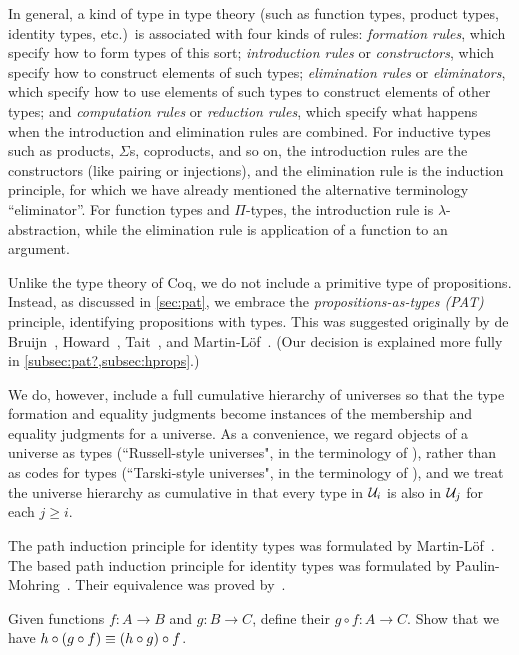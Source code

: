 In general, a kind of type in type theory (such as function types, product types, identity types, etc.)\ is associated with four kinds of rules: \emph{formation rules}, which specify how to form types of this sort; \emph{introduction rules}  or \emph{constructors}, which specify how to construct elements of such types; \emph{elimination rules} or \emph{eliminators}, which specify how to use elements of such types to construct elements of other types; and \emph{computation rules} or \emph{reduction rules}, which specify what happens when the introduction and elimination rules are combined.
For inductive types such as products, $\Sigma$s, coproducts, and so on, the introduction rules are the constructors (like pairing or injections), and the elimination rule is the induction principle, for which we have already mentioned the alternative terminology ``eliminator''.
For function types and $\Pi$-types, the introduction rule is $\lambda$-abstraction, while the elimination rule is application of a function to an argument.

Unlike the type theory of Coq, we do not include a primitive type of propositions.  Instead, as discussed in \autoref{sec:pat}, we embrace the \emph{propositions-as-types (PAT)} principle, identifying propositions with types.
This was suggested originally by de Bruijn~\cite{deBruijn-1973}, Howard~\cite{howard:pat}, Tait~\cite{Tait-1968}, and Martin-L\"{o}f~\cite{Martin-Lof-1972}.
(Our decision is explained more fully in \autoref{subsec:pat?,subsec:hprops}.)

We do, however, include a full cumulative hierarchy of universes so that the type formation and equality judgments become instances of the membership and equality judgments for a universe.
As a convenience, we regard objects of a universe as types (``Russell-style universes", in the terminology of \cite{martin-lof:bibliopolis}), rather than as codes for types (``Tarski-style universes", in the terminology of \cite{martin-lof:bibliopolis}), and we treat the universe hierarchy as cumulative in that every type in $\mathcal{U}_i$ is also in $\mathcal{U}_j$ for each $j\geq i$.

The path induction principle for identity types was formulated by Martin-L\"{o}f~\cite{pml-id}.  The based path induction principle for identity types was formulated by Paulin-Mohring~\cite{cpm-id}.
Their equivalence was proved by~\cite{cpm-id}. %

\sectionExercises

\begin{ex}\label{ex:composition}
  Given functions $f:A\to B$ and $g:B\to C$, define their  $g\circ f:A\to C$.
  Show that we have $h \circ (g\circ f) \equiv (h\circ g)\circ f$.
\end{ex}

